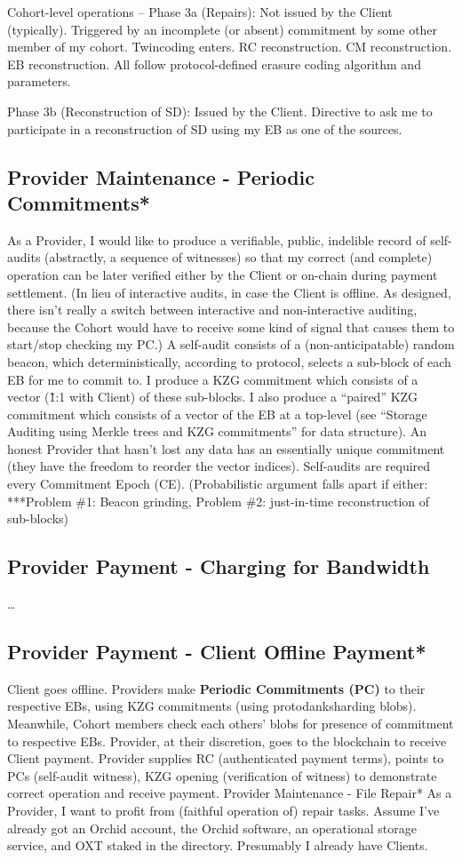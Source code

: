 \documentclass{article}
\begin{document}
Cohort-level operations –
Phase 3a (Repairs):
Not issued by the Client (typically). Triggered by an incomplete (or absent) commitment by some other member of my cohort. Twincoding enters. RC reconstruction. CM reconstruction. EB reconstruction. All follow protocol-defined erasure coding algorithm and parameters.

Phase 3b (Reconstruction of SD):
Issued by the Client. Directive to ask me to participate in a reconstruction of SD using my EB as one of the sources.


\subsection{Provider Maintenance - Periodic Commitments*}
As a Provider, I would like to produce a verifiable, public, indelible record of self-audits (abstractly, a sequence of witnesses) so that my correct (and complete) operation can be later verified either by the Client or on-chain during payment settlement. (In lieu of interactive audits, in case the Client is offline. As designed, there isn’t really a switch between interactive and non-interactive auditing, because the Cohort would have to receive some kind of signal that causes them to start/stop checking my PC.) A self-audit consists of a (non-anticipatable) random beacon, which deterministically, according to protocol, selects a sub-block of each EB for me to commit to. I produce a KZG commitment which consists of a vector (\~1:1 with Client) of these sub-blocks. I also produce a “paired” KZG commitment which consists of a vector of the EB at a top-level (see “Storage Auditing using Merkle trees and KZG commitments” for data structure). An honest Provider that hasn’t lost any data has an essentially unique commitment (they have the freedom to reorder the vector indices). Self-audits are required every Commitment Epoch (CE). (Probabilistic argument falls apart if either: ***Problem \#1: Beacon grinding, 
Problem \#2: just-in-time reconstruction of sub-blocks)


\subsection{Provider Payment - Charging for Bandwidth} \label{Paying for Bandwidth}
…
\subsection{Provider Payment - Client Offline Payment*}
Client goes offline. Providers make \textbf{Periodic Commitments (PC)} to their respective EBs, using KZG commitments (using protodanksharding blobs). Meanwhile, Cohort members check each others’ blobs for presence of commitment to respective EBs. Provider, at their discretion, goes to the blockchain to receive Client payment. Provider supplies RC (authenticated payment terms), points to PCs (self-audit witness), KZG opening (verification of witness) to demonstrate correct operation and receive payment.
Provider Maintenance - File Repair*
As a Provider, I want to profit from (faithful operation of) repair tasks. Assume I’ve already got an Orchid account, the Orchid software, an operational storage service, and OXT staked in the directory. Presumably I already have Clients.
\end{document}
